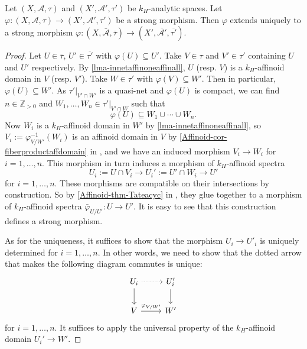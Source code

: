 \begin{proposition}\label{prop-strongmorphismext}
    Let $(X,\mathcal{A},\tau)$ and $(X',\mathcal{A}',\tau')$ be $k_H$-analytic spaces. Let $\varphi:(X,\mathcal{A},\tau)\rightarrow (X',\mathcal{A}',\tau')$ be a strong morphism. Then $\varphi$ extends uniquely to a strong morphism $\varphi:(X,\bar{\mathcal{A}},\bar{\tau})\rightarrow (X',\overline{\mathcal{A}'},\overline{\tau'})$.
\end{proposition}
\begin{proof}
    Let $U\in \bar{\tau}$, $U'\in \overline{\tau'}$ with $\varphi(U)\subseteq U'$. Take $V\in \tau$ and $V'\in \tau'$ containing $U$ and $U'$ respectively. By \cref{lma-innetaffinoneaffinall}, $U$ (resp. $V$) is a $k_H$-affinoid domain in $V$ (resp. $V'$). Take $W\in \tau'$ with $\varphi(V)\subseteq W'$. Then in particular, $\varphi(U)\subseteq W'$. As $\tau'|_{V'\cap W'}$ is a quasi-net and $\varphi(U)$ is compact, we can find $n\in \mathbb{Z}_{>0}$ and $W_1,\ldots,W_n\in \tau'|_{V'\cap W}$ such that 
    \[
        \varphi(U)\subseteq W_1\cup\cdots\cup W_n.
    \]
    Now $W_i$ is a $k_H$-affinoid domain in $W'$ by \cref{lma-innetaffinoneaffinall}, so $V_i:=\varphi^{-1}_{V/W'}(W_i)$ is an affinoid domain in $V$ by \cref{Affinoid-cor-fiberproductaffdomain} in , and we have an induced morphism $V_i\rightarrow W_i$ for $i=1,\ldots,n$. This morphism in turn induces a morphism of $k_H$-affinoid spectra
    \[
        U_i:=U\cap V_i\rightarrow U_i':=U'\cap W_i  \rightarrow U'
    \]
    for $i=1,\ldots,n$. These morphisms are compatible on their intersections by construction. So by \cref{Affinoid-thm-Tateacyc} in , they glue together to a morphism of $k_H$-affinoid spectra $\bar{\varphi}_{U/U'}:U\rightarrow U'$. It is easy to see that this construction defines a strong morphism.

    As for the uniqueness, it suffices to show that the morphism $U_i\rightarrow U'_i$ is uniquely determined for $i=1,\ldots,n$. In other words, we need to show that the dotted arrow that makes the following diagram commutes is unique:
    \[
        \begin{tikzcd}
            U_i \arrow[d] \arrow[r, dotted] & U'_i \arrow[d] \\
            V \arrow[r, "\varphi_{V/W'}"]   & W'            
        \end{tikzcd}  
    \]
    for $i=1,\ldots,n$.
    It suffices to apply the universal property of the $k_H$-affinoid domain $U_i'\rightarrow W'$.
\end{proof}

